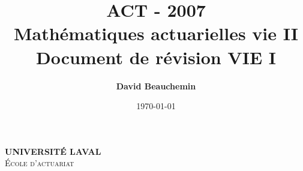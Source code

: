\documentclass[11pt,french]{report}
\title{ACT - 2007 \\ Mathématiques actuarielles vie II \\ Document de révision VIE I}
\author{\textbf{David Beauchemin}}
\date{\today}
\begin{document}
\makeatletter
  \begin{titlepage}
  \centering
      {\large \textbf{\textsc{UNIVERSITÉ LAVAL}}}\\
      \textsc{École d'actuariat}\\
    \vspace{2cm}
    \vspace{2cm}
      {\LARGE \textbf{\@title}} \\
    \vfill
       {\large \@author} \\
    \vspace{4cm}
        {\large\textbf{\@date}}\\
    \vfill
  \end{titlepage}
\makeatother
\newpage

\tableofcontents








\end{document}
